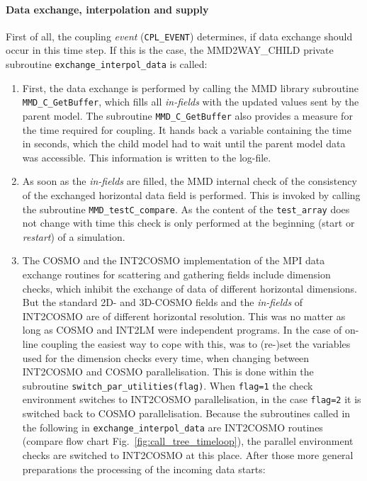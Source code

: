 \documentclass[11pt,twoside]{article}
\begin{document}
\paragraph{Data exchange, interpolation and supply\\}
First of all, the coupling {\it event} (\verb|CPL_EVENT|) determines,
 if data exchange should occur in this time step. If this is the case, the
MMD2WAY\_CHILD private subroutine \verb|exchange_interpol_data| is called:
\begin{enumerate} %
\item First, the data exchange is performed by calling the MMD library 
subroutine 
\verb|MMD_C_GetBuffer|, which fills all {\it in-fields} with the updated values 
sent by the parent model.
The subroutine \verb|MMD_C_GetBuffer| also provides a measure for the
time required for coupling. It hands back a variable containing the time
in seconds, 
which the child model had to wait until the parent model data was accessible. 
This information is written to the log-file.
\item
As soon as the {\it in-fields} are filled, the MMD internal check of the 
consistency
of the exchanged horizontal data field is performed. This is invoked by 
calling the subroutine \verb|MMD_testC_compare|. As the content of the 
\verb|test_array| does not change with time this check is only performed at the
beginning (start or {\it restart}) of a simulation.

\item The COSMO and the INT2COSMO implementation of the MPI data exchange 
routines 
for scattering and gathering fields include dimension checks, which inhibit the
exchange of data of different horizontal dimensions. But the standard 2D- and 
3D-COSMO fields  and the {\it in-fields} of INT2COSMO are of different
 horizontal resolution. 
This was no matter as long as COSMO and INT2LM were independent programs. In
the case of on-line coupling the easiest way to cope with this, was to (re-)set 
the variables used for the dimension checks every time, when changing between
INT2COSMO and COSMO parallelisation. This is done within the subroutine
\verb|switch_par_utilities(flag)|. When \verb|flag=1| the check environment
switches to INT2COSMO parallelisation, in the case \verb|flag=2| it is switched
back to COSMO parallelisation.
Because the subroutines called in the following in \verb|exchange_interpol_data|
 are INT2COSMO routines (compare flow chart Fig.\ \ref{fig:call_tree_timeloop}),
the parallel environment checks are switched to INT2COSMO at this place.
After those more general preparations the processing of the incoming data starts:
\begin{itemize} %


\end{itemize}
\end{enumerate}
\end{document}
